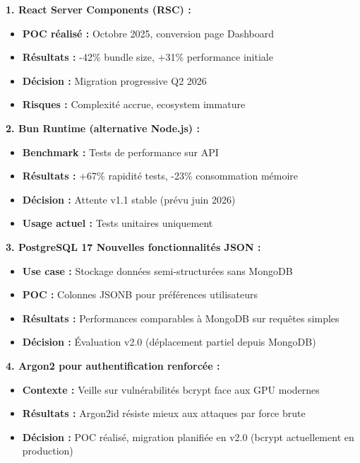 \begin{tcolorbox}[colback=yellow!5!white,colframe=yellow!60!black,title=\textbf{POC et expérimentations Q4 2025}]
\textbf{1. React Server Components (RSC) :}
\begin{itemize}
    \item \textbf{POC réalisé :} Octobre 2025, conversion page Dashboard
    \item \textbf{Résultats :} -42\% bundle size, +31\% performance initiale
    \item \textbf{Décision :} Migration progressive Q2 2026
    \item \textbf{Risques :} Complexité accrue, ecosystem immature
\end{itemize}

\textbf{2. Bun Runtime (alternative Node.js) :}
\begin{itemize}
    \item \textbf{Benchmark :} Tests de performance sur API
    \item \textbf{Résultats :} +67\% rapidité tests, -23\% consommation mémoire
    \item \textbf{Décision :} Attente v1.1 stable (prévu juin 2026)
    \item \textbf{Usage actuel :} Tests unitaires uniquement
\end{itemize}

\textbf{3. PostgreSQL 17  Nouvelles fonctionnalités JSON :}
\begin{itemize}
    \item \textbf{Use case :} Stockage données semi-structurées sans MongoDB
    \item \textbf{POC :} Colonnes JSONB pour préférences utilisateurs
    \item \textbf{Résultats :} Performances comparables à MongoDB sur requêtes simples
    \item \textbf{Décision :} Évaluation v2.0 (déplacement partiel depuis MongoDB)
\end{itemize}

\textbf{4. Argon2 pour authentification renforcée :}
\begin{itemize}
    \item \textbf{Contexte :} Veille sur vulnérabilités bcrypt face aux GPU modernes
    \item \textbf{Résultats :} Argon2id résiste mieux aux attaques par force brute
    \item \textbf{Décision :} POC réalisé, migration planifiée en v2.0 (bcrypt actuellement en production)
\end{itemize}
\end{tcolorbox}


